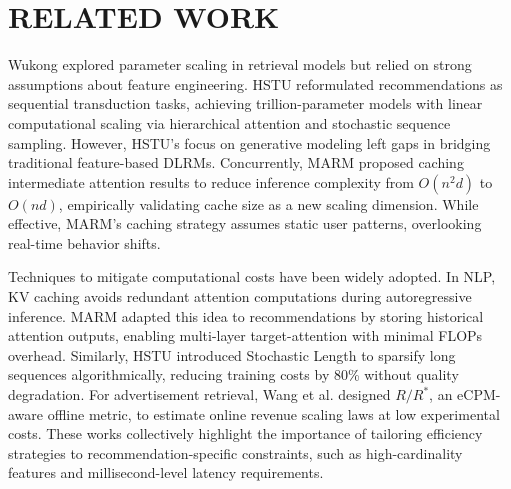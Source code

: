 \section{RELATED WORK}
Wukong \cite{zhang2024wukong} explored parameter scaling in retrieval models but relied on strong assumptions about feature engineering. HSTU \cite{zhai2024actions} reformulated recommendations as sequential transduction tasks, achieving trillion-parameter models with linear computational scaling via hierarchical attention and stochastic sequence sampling. However, HSTU’s focus on generative modeling left gaps in bridging traditional feature-based DLRMs. Concurrently, MARM \cite{lv2024marm} proposed caching intermediate attention results to reduce inference complexity from ${O(n^2d)}$ to $O(nd)$, empirically validating cache size as a new scaling dimension. While effective, MARM’s caching strategy assumes static user patterns, overlooking real-time behavior shifts.

Techniques to mitigate computational costs have been widely adopted. In NLP, KV caching \cite{liu2024scissorhands,dong2024get} avoids redundant attention computations during autoregressive inference. MARM adapted this idea to recommendations by storing historical attention outputs, enabling multi-layer target-attention with minimal FLOPs overhead. Similarly, HSTU introduced Stochastic Length to sparsify long sequences algorithmically, reducing training costs by 80\% without quality degradation. For advertisement retrieval, Wang et al. \cite{wang2024scaling} designed $R/R^*$, an eCPM-aware offline metric, to estimate online revenue scaling laws at low experimental costs. These works collectively highlight the importance of tailoring efficiency strategies to recommendation-specific constraints, such as high-cardinality features and millisecond-level latency requirements.